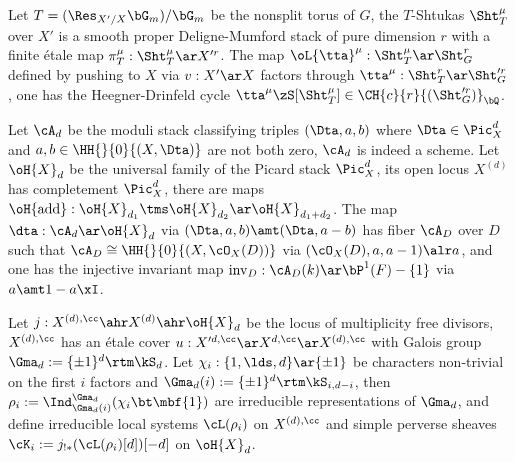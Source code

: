 \documentclass[a4paper, twoside]{article}
\begin{document}

\begin{stp}
	Let $T=(\Res_{X'/X}\bG_{m})/\bG_{m}$ be the nonsplit torus of $G$, the $T$-Shtukas $\Sht_{T}^{\mu}$ over $X'$ is a smooth proper Deligne-Mumford stack of pure dimension $r$ with a finite {\'e}tale map $\pi_{T}^{\mu}:\Sht_{T}^{\mu}\ar X^{\prime r}$. The map $\oL{\tta}^{\mu}:\Sht_{T}^{\mu}\ar\Sht_{G}^{r}$ defined by pushing to $X$ via $v:X'\ar X$ factors through $\tta^{\mu}:\Sht_{T}^{r}\ar\Sht_{G}^{\prime r}$, one has the Heegner-Drinfeld cycle $\tta^{\mu}\zS[\Sht_{T}^{\mu}]\in\CH{c}{r}{(\Sht_{G}^{\prime r})}_{\bQ}$.

	 Let $\cA_{d}$ be the moduli stack classifying triples $(\Dta,a,b)$ where $\Dta\in\Pic_{X}^{d}$ and $a,b\in\HH{}{0}{(X,\Dta)}$ are not both zero, $\cA_{d}$ is indeed a scheme. Let $\oH{X}_{d}$ be the universal family of the Picard stack $\Pic_{X}^{d}$, its open locus $X^{(d)}$ has completement $\Pic_{X}^{d}$, there are maps $\oH{\mathrm{add}}:\oH{X}_{d_{1}}\tms\oH{X}_{d_{2}}\ar\oH{X}_{d_{1}+d_{2}}$. The map $\dta:\cA_{d}\ar\oH{X}_{d}$ via $(\Dta,a,b)\amt(\Dta,a-b)$ has fiber $\cA_{D}$ over $D$ such that $\cA_{D}\cong\HH{}{0}{(X,\cO_{X}(D))}$ via $(\cO_{X}(D),a,a-1)\alr a$, and one has the injective invariant map $\mathrm{inv}_{D}:\cA_{D}(k)\ar\bP^{1}(F)-\{1\}$ via $a\amt1-a\xI$.

	Let $j:X^{(d),\cc}\ahr X^{(d)}\ahr \oH{X}_{d}$ be the locus of multiplicity free divisors, $X^{(d),\cc}$ has an {\'e}tale cover $u:X^{\prime d,\cc}\ar X^{d,\cc}\ar X^{(d),\cc}$ with Galois group $\Gma_{d}:=\{\pm1\}^{d}\rtm \kS_{d}$. Let $\chi_{i}:\{1,\lds,d\}\ar\{\pm1\}$ be characters non-trivial on the first $i$ factors and $\Gma_{d}(i):=\{\pm1\}^{d}\rtm\kS_{i,d-i}$, then $\rho_{i}:=\Ind_{\Gma_{d}(i)}^{\Gma_{d}}(\chi_{i}\bt\mbf{1})$ are irreducible representations of $\Gma_{d}$, and define irreducible local systems $\cL(\rho_{i})$ on $X^{(d),\cc}$ and simple perverse sheaves $\cK_{i}:=j_{!*}(\cL(\rho_{i})[d])[-d]$ on $\oH{X}_{d}$.


\end{stp}
\end{document}
